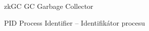 \begin{seznamzkratek}{zkGC}
		{GC}
		{Garbage Collector}
	
		{PID}
		{Process Identifier -- Identifikátor procesu}
\end{seznamzkratek}

